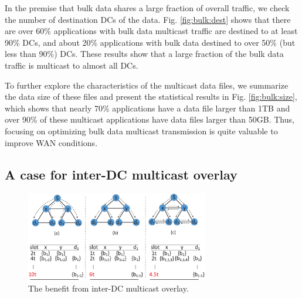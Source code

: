 In the premise that bulk data shares a large fraction of overall traffic, we check the number of destination DCs of the data. Fig. \ref{fig:bulk:dest} shows that there are over 60\% applications with bulk data multicast traffic are destined to at least 90\% DCs, and about 20\% applications with bulk data destined to over 50\% (but less than 90\%) DCs. These results show that a large fraction of the bulk data traffic is multicast to almost all DCs.

To further explore the characteristics of the multicast data files, we summarize the data size of these files and present the statistical results in Fig. \ref{fig:bulk:size}, which shows that nearly 70\% applications have a data file larger than 1TB and over 90\% of these multicast applications have data files larger than 50GB. Thus, focusing on optimizing bulk data multicast transmission is quite valuable to improve WAN conditions.

%
%
%
%

\subsection{A case for inter-DC multicast overlay}
\label{subsec:motivation:case-for}

\begin{figure}[t]
\centering
\includegraphics[width=80mm]{images/example.eps}
\caption{The benefit from inter-DC multicast overlay.}
\label{fig:case:example}
\vspace{-0.4cm}
\end{figure}

